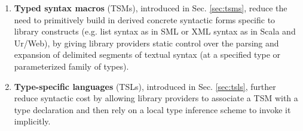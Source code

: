 \begin{enumerate}
\item \textbf{Typed syntax macros} (TSMs), introduced in Sec. \ref{sec:tsms}, reduce the need to primitively build in derived concrete syntactic forms specific to library constructs (e.g. list syntax as in SML or XML syntax as in Scala and Ur/Web), by giving library providers static control over the parsing and expansion of delimited segments of textual syntax (at a specified type or parameterized family of types). 
\item \textbf{Type-specific languages} (TSLs), introduced in Sec. \ref{sec:tsls}, further reduce syntactic cost by allowing library providers to associate a TSM with a type declaration and then rely on a local type inference scheme to invoke it implicitly.
\end{enumerate} 
